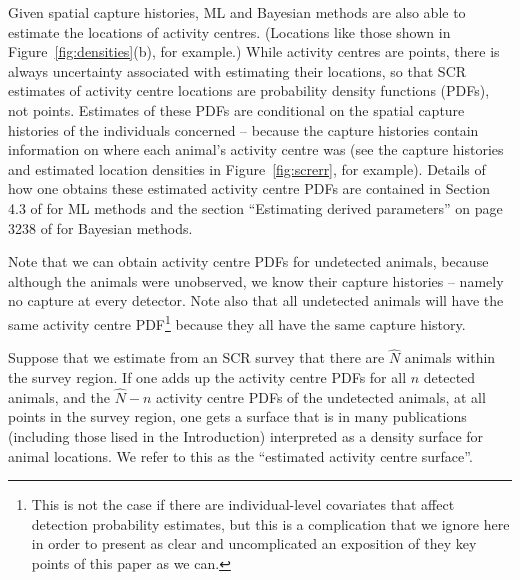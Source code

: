 \documentclass[10pt,a4paper]{article}
\begin{document}
Given spatial capture histories, ML and Bayesian methods are also able to estimate the locations of activity centres. (Locations like those shown in Figure~\ref{fig:densities}(b), for example.) While activity centres are points, there is always uncertainty associated with estimating their locations, so that SCR estimates of activity centre locations are probability density functions (PDFs), not points. Estimates of these PDFs are conditional on the spatial capture histories of the individuals concerned -- because the capture histories contain information on where each animal's activity centre was (see the capture histories and estimated location densities in Figure~\ref{fig:screrr}, for example). Details of how one obtains these estimated activity centre PDFs are contained in Section 4.3 of \cite{Borchers+Efford:08} for ML methods and the section ``Estimating derived parameters'' on page 3238 of \cite{Royle+al:09b} for Bayesian methods.

Note that we can obtain activity centre PDFs for undetected animals, because although the animals were unobserved, we know their capture histories -- namely no capture at every detector. Note also that all undetected animals will have the same activity centre PDF\footnote{This is not the case if there are individual-level covariates that affect detection probability estimates, but this is a complication that we ignore here in order to present as clear and uncomplicated an exposition of they key points of this paper as we can.} because they all have the same capture history. 

Suppose that we estimate from an SCR survey that there are $\hat{N}$ animals within the survey region. If one adds up the activity centre PDFs for all $n$ detected animals, and the $\hat{N}-n$ activity centre PDFs of the undetected animals, at all points in the survey region, one gets a surface that is in many publications (including those lised in the Introduction) interpreted as a density surface for animal locations.  We refer to this as the ``estimated activity centre surface''.
\end{document}
